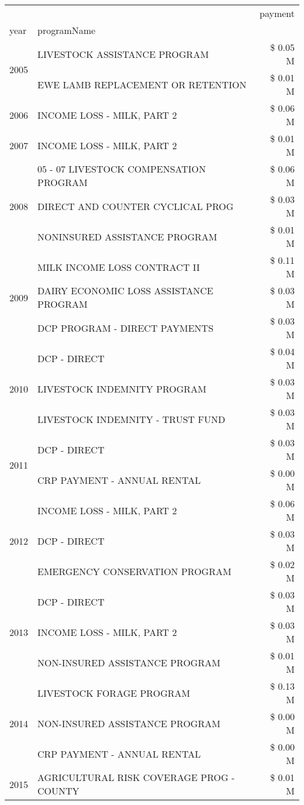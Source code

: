 \begin{tabular}{llr}
\toprule
 &  & payment \\
year & programName &  \\
\midrule
\multirow[t]{2}{*}{2005} & LIVESTOCK ASSISTANCE PROGRAM & \$ 0.05 M \\
 & EWE LAMB REPLACEMENT OR RETENTION & \$ 0.01 M \\
\cline{1-3}
2006 & INCOME LOSS - MILK, PART 2 & \$ 0.06 M \\
\cline{1-3}
2007 & INCOME LOSS - MILK, PART 2 & \$ 0.01 M \\
\cline{1-3}
\multirow[t]{3}{*}{2008} & 05 - 07 LIVESTOCK COMPENSATION PROGRAM & \$ 0.06 M \\
 & DIRECT AND COUNTER CYCLICAL PROG & \$ 0.03 M \\
 & NONINSURED ASSISTANCE PROGRAM & \$ 0.01 M \\
\cline{1-3}
\multirow[t]{3}{*}{2009} & MILK INCOME LOSS CONTRACT II & \$ 0.11 M \\
 & DAIRY ECONOMIC LOSS ASSISTANCE PROGRAM & \$ 0.03 M \\
 & DCP PROGRAM - DIRECT PAYMENTS & \$ 0.03 M \\
\cline{1-3}
\multirow[t]{3}{*}{2010} & DCP - DIRECT & \$ 0.04 M \\
 & LIVESTOCK INDEMNITY PROGRAM & \$ 0.03 M \\
 & LIVESTOCK INDEMNITY - TRUST FUND & \$ 0.03 M \\
\cline{1-3}
\multirow[t]{2}{*}{2011} & DCP - DIRECT & \$ 0.03 M \\
 & CRP PAYMENT - ANNUAL RENTAL & \$ 0.00 M \\
\cline{1-3}
\multirow[t]{3}{*}{2012} & INCOME LOSS - MILK, PART 2 & \$ 0.06 M \\
 & DCP - DIRECT & \$ 0.03 M \\
 & EMERGENCY CONSERVATION PROGRAM & \$ 0.02 M \\
\cline{1-3}
\multirow[t]{3}{*}{2013} & DCP - DIRECT & \$ 0.03 M \\
 & INCOME LOSS - MILK, PART 2 & \$ 0.03 M \\
 & NON-INSURED ASSISTANCE PROGRAM & \$ 0.01 M \\
\cline{1-3}
\multirow[t]{3}{*}{2014} & LIVESTOCK FORAGE PROGRAM & \$ 0.13 M \\
 & NON-INSURED ASSISTANCE PROGRAM & \$ 0.00 M \\
 & CRP PAYMENT - ANNUAL RENTAL & \$ 0.00 M \\
\cline{1-3}
\multirow[t]{2}{*}{2015} & AGRICULTURAL RISK COVERAGE PROG - COUNTY & \$ 0.01 M \\

\end{tabular}
